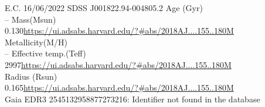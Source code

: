E.C. 16/06/2022
SDSS J001822.94-004805.2
Age (Gyr)\\
--
Mass(Msun)\\
0.130\url{https://ui.adsabs.harvard.edu/?#abs/2018AJ....155..180M}\\
Metallicity(M/H)\\
--
Effective temp.(Teff)\\
2997\url{https://ui.adsabs.harvard.edu/?#abs/2018AJ....155..180M}\\
Radius (Rsun)\\
0.165\url{https://ui.adsabs.harvard.edu/?#abs/2018AJ....155..180M}\\

Gaia EDR3 2545132958877273216: Identifier not found in the database
\url{}\\
\url{}\\
\url{}\\
\url{}\\
\url{}\\
\url{}\\
\url{}\\
\url{}\\
\url{}\\
\url{}\\
\url{}\\
\url{}\\